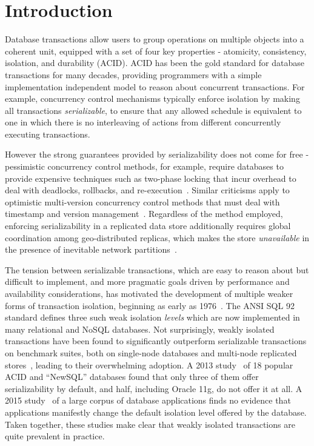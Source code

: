 \section{Introduction}

Database transactions allow users to group operations on multiple
objects into a coherent unit, equipped with a set of four key
properties - atomicity, consistency, isolation, and durability
(ACID). ACID has been the gold standard for database transactions for
many decades, providing programmers with a simple implementation
independent model to reason about concurrent transactions.  For
example, concurrency control mechanisms typically enforce isolation by
making all transactions \emph{serializable}, to ensure that any
allowed schedule is equivalent to one in which there is no
interleaving of actions from different concurrently executing
transactions.

However the strong guarantees provided by serializability does not
come for free - pessimistic concurrency control methods, for example,
require databases to provide expensive techniques such as two-phase
locking that incur overhead to deal with deadlocks, rollbacks, and
re-execution~\cite{twopl,ullmanbook}.  Similar criticisms apply to
optimistic multi-version concurrency control methods that must deal
with timestamp and version management~\cite{BG81}.  Regardless of the
method employed, enforcing serializability in a replicated data store
additionally requires global coordination among geo-distributed
replicas, which makes the store \emph{unavailable} in the presence of
inevitable network
partitions~\cite{cap,sernotavlbl,bailishat,bernsigmod13}.

The tension between serializable transactions, which are easy to
reason about but difficult to implement, and more pragmatic goals
driven by performance and availability considerations, has motivated
the development of multiple weaker forms of transaction isolation,
beginning as early as 1976~\cite{gray1976}. The ANSI SQL 92 standard
defines three such weak isolation \emph{levels} which are now
implemented in many relational and NoSQL databases. Not surprisingly,
weakly isolated transactions have been found to significantly
outperform serializable transactions on benchmark suites, both on
single-node databases and multi-node replicated
stores~\cite{dbtuningbook,bailishat,bailisvldb}, leading to their
overwhelming adoption. A 2013 study~\cite{bailishotos} of 18 popular
ACID and ``NewSQL'' databases found that only three of them offer
serializability by default, and half, including Oracle 11g, do not
offer it at all.  A 2015 study~\cite{bailisferal} of a large corpus of
database applications finds no evidence that applications manifestly
change the default isolation level offered by the database. Taken
together, these studies make clear that weakly isolated transactions
are quite prevalent in practice.

